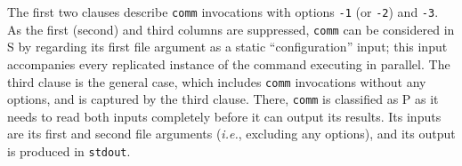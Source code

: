\documentclass[letterpaper,twocolumn,10pt]{article}
\newcommand{\ie}{{\em i.e.}, }
\newcommand{\ttt}[1]{\texttt{#1}}
\newcommand{\cn}[1]{\mbox{\textcircled{\footnotesize #1}}}
\newcommand{\sta}{\cn{\textsc{S}}\xspace}
\newcommand{\pur}{\cn{\textsc{P}}\xspace}
\newcommand{\kk}[1]{[{\color{magenta}kk: #1}]}
\begin{document}
\noindent
The first two clauses describe \ttt{comm} invocations with options \ttt{-1} (or \ttt{-2}) and \ttt{-3}.
As the first (second) and third columns are suppressed, \ttt{comm} can be considered in \sta by regarding its first file argument as a static ``configuration'' input;
  this input accompanies every replicated instance of the command executing in parallel.
The third clause is the general case, which includes \ttt{comm} invocations without any options, and is captured by the third clause.
There, \ttt{comm} is classified as \pur as it needs to %
  read both inputs completely before it can output its results.
Its inputs are its first and second file arguments (\ie excluding any options), and its output is produced in \ttt{stdout}.




\end{document}
